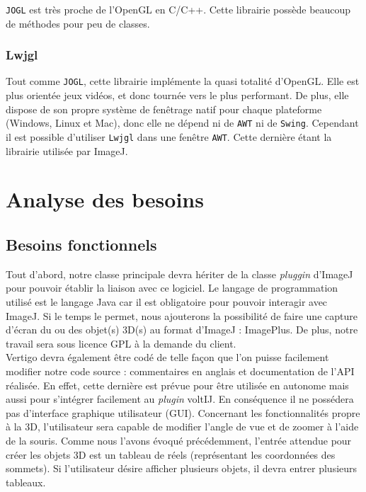 \documentclass[11pt]{report}
\begin{document}
\texttt{JOGL} est très proche de l'OpenGL en C/C++. Cette librairie possède beaucoup de méthodes pour peu de classes.


\subsection{Lwjgl}
Tout comme \texttt{JOGL}, cette librairie implémente la quasi totalité d'OpenGL. Elle est plus orientée jeux vidéos, et donc tournée vers le plus performant. De plus, elle dispose de son propre système de fenêtrage natif pour chaque plateforme (Windows, Linux et Mac), donc elle ne dépend ni de \texttt{AWT} ni de \texttt{Swing}. 
Cependant il est possible d'utiliser \texttt{Lwjgl} dans une fenêtre \texttt{AWT}.
Cette dernière étant la librairie utilisée par ImageJ.

\chapter{Analyse des besoins}

\section{Besoins fonctionnels}
Tout d'abord, notre classe principale devra hériter de la classe \textit{pluggin} d'ImageJ pour pouvoir établir la liaison avec ce logiciel.
Le langage de programmation utilisé est le langage Java car il est obligatoire pour pouvoir interagir avec ImageJ. Si le temps le permet, nous ajouterons la possibilité de faire une capture d'écran du ou des objet(s) 3D(s) au format d'ImageJ : ImagePlus.
De plus, notre travail sera sous licence GPL à la demande du client.\\

Vertigo devra également être codé de telle façon que l'on puisse facilement modifier notre code source : commentaires en anglais et documentation de l'API réalisée. En effet, cette dernière est prévue pour être utilisée en autonome mais aussi pour s'intégrer facilement au \textit{plugin} voltIJ. En conséquence il ne possédera pas d'interface graphique utilisateur (GUI).
Concernant les fonctionnalités propre à la 3D, l'utilisateur sera capable de modifier l'angle de vue et de zoomer  à l'aide de la souris.
Comme nous l'avons évoqué précédemment, l'entrée attendue pour créer les objets 3D est un tableau de réels (représentant les coordonnées des sommets). Si l'utilisateur désire afficher plusieurs objets, il devra entrer plusieurs tableaux.\\
\end{document}

